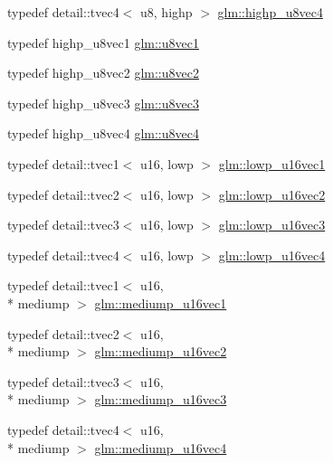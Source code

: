 \begin{DoxyCompactItemize}
\item 
typedef detail\-::tvec4$<$ u8, highp $>$ \hyperlink{group__gtc__type__precision_ga3a46f19674a65471988b41ffdaa834c5}{glm\-::highp\-\_\-u8vec4}
\item 
typedef highp\-\_\-u8vec1 \hyperlink{group__gtc__type__precision_gaf0155c700da11c0b5518a777d1f0cd23}{glm\-::u8vec1}
\item 
typedef highp\-\_\-u8vec2 \hyperlink{group__gtc__type__precision_gaa7ea171741c23b5bb2a3c91fe8c84e8a}{glm\-::u8vec2}
\item 
typedef highp\-\_\-u8vec3 \hyperlink{group__gtc__type__precision_ga3b4624ecd0485fe5143f956864e7934e}{glm\-::u8vec3}
\item 
typedef highp\-\_\-u8vec4 \hyperlink{group__gtc__type__precision_gaaf6b3d127698d893de8652deedfd3d9b}{glm\-::u8vec4}
\item 
typedef detail\-::tvec1$<$ u16, lowp $>$ \hyperlink{group__gtc__type__precision_ga25464b09e8e3c63f6896605e0c997eb1}{glm\-::lowp\-\_\-u16vec1}
\item 
typedef detail\-::tvec2$<$ u16, lowp $>$ \hyperlink{group__gtc__type__precision_gaff5ca5a8bc621bb8f4b28f046c0de508}{glm\-::lowp\-\_\-u16vec2}
\item 
typedef detail\-::tvec3$<$ u16, lowp $>$ \hyperlink{group__gtc__type__precision_ga74d5491c9ee66d068309d200601e907b}{glm\-::lowp\-\_\-u16vec3}
\item 
typedef detail\-::tvec4$<$ u16, lowp $>$ \hyperlink{group__gtc__type__precision_gab0210f390e7d75fa8eb42128a05ff23a}{glm\-::lowp\-\_\-u16vec4}
\item 
typedef detail\-::tvec1$<$ u16, \\*
mediump $>$ \hyperlink{group__gtc__type__precision_gacb35d25d662b2a6396d094197ca834f0}{glm\-::mediump\-\_\-u16vec1}
\item 
typedef detail\-::tvec2$<$ u16, \\*
mediump $>$ \hyperlink{group__gtc__type__precision_ga93fe5ddc21391f0334eb3a60b76c390b}{glm\-::mediump\-\_\-u16vec2}
\item 
typedef detail\-::tvec3$<$ u16, \\*
mediump $>$ \hyperlink{group__gtc__type__precision_ga82dbfd263ced8d03577008a3ef096598}{glm\-::mediump\-\_\-u16vec3}
\item 
typedef detail\-::tvec4$<$ u16, \\*
mediump $>$ \hyperlink{group__gtc__type__precision_gaad8b540f4231f69823c39fe9dfcb945a}{glm\-::mediump\-\_\-u16vec4}
\item 

\end{DoxyCompactItemize}
